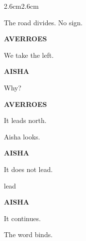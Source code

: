 \begin{adjustwidth}{2.6cm}{2.6cm}

\vspace{2em}

The road divides. No sign.

\vspace{2em}

\textbf{AVERROES}

We take the left.

\medskip

\textbf{AISHA}

Why?

\medskip

\textbf{AVERROES}

It leads north.

\medskip

Aisha looks.

\medskip

\textbf{AISHA}

It does not lead.

\medskip

 lead

\medskip

\textbf{AISHA}

It continues.

\medskip


\medskip

The word binds.

\vspace{3em}

\end{adjustwidth}

\begin{center}

\smallskip


\smallskip

\end{center}

\vspace{2em}

